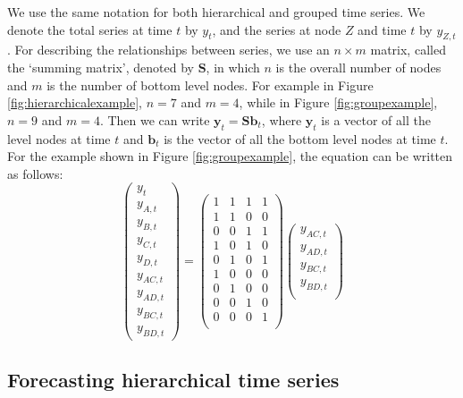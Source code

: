 \documentclass[11pt,a4paper,]{article}
\begin{document}
We use the same notation \autocite[following][]{fpp2} for both hierarchical and grouped time series. We denote the total series at time \(t\) by \(y_t\), and the series at node \(Z\) and time \(t\) by \(y_{Z,t}\). For describing the relationships between series, we use an \(n\times m\) matrix, called the `summing matrix', denoted by \(\bm{S}\), in which \(n\) is the overall number of nodes and \(m\) is the number of bottom level nodes. For example in Figure \ref{fig:hierarchicalexample}, \(n = 7\) and \(m = 4\), while in Figure \ref{fig:groupexample}, \(n=9\) and \(m=4\). Then we can write \(\bm{y}_t=\bm{S}\bm{b}_t\), where \(\bm{y}_t\) is a vector of all the level nodes at time \(t\) and \(\bm{b}_t\) is the vector of all the bottom level nodes at time \(t\). For the example shown in Figure \ref{fig:groupexample}, the equation can be written as follows:
\begin{equation}\label{eq:Smatrixexample}
\begin{pmatrix}
  y_{t}\\y_{A,t}\\y_{B,t}\\y_{C,t}\\y_{D,t}\\y_{AC,t}\\y_{AD,t}\\y_{BC,t}\\y_{BD,t}
\end{pmatrix} =
\begin{pmatrix}
  1&1&1&1\\1&1&0&0\\0&0&1&1\\1&0&1&0\\0&1&0&1\\1&0&0&0\\0&1&0&0\\0&0&1&0\\0&0&0&1\\
\end{pmatrix}
\begin{pmatrix}
  y_{AC,t}\\y_{AD,t}\\y_{BC,t}\\y_{BD,t}\\
\end{pmatrix}
\end{equation}

\hypertarget{forecasting-hierarchical-time-series}{%
\subsection{Forecasting hierarchical time series}\label{forecasting-hierarchical-time-series}}
\end{document}
